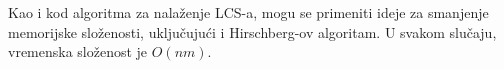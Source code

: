 \noindent
\begin{minipage}[l]{\textwidth}

\end{minipage}

Kao i kod algoritma za nala\v zenje LCS-a, mogu se primeniti ideje za smanjenje memorijske slo\v zenosti, uklju\v cuju\' ci i Hirschberg-ov algoritam. U svakom slu\v caju, vremenska slo\v zenost je $O(nm)$.